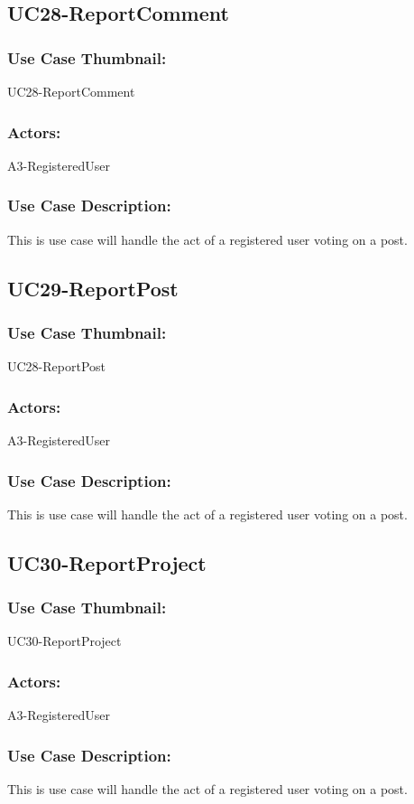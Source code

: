 \documentclass[11pt, openany]{report}
\begin{document}
\subsection{UC28-ReportComment}
\label{sUC28}
\subsubsection*{Use Case Thumbnail:}
UC28-ReportComment
\subsubsection*{Actors:}
A3-RegisteredUser
\subsubsection*{Use Case Description:}
This is use case will handle the act of a registered user voting on a post.

\subsection{UC29-ReportPost}
\label{sUC29}
\subsubsection*{Use Case Thumbnail:}
UC28-ReportPost
\subsubsection*{Actors:}
A3-RegisteredUser
\subsubsection*{Use Case Description:}
This is use case will handle the act of a registered user voting on a post.


\subsection{UC30-ReportProject}
\label{sUC30}
\subsubsection*{Use Case Thumbnail:}
UC30-ReportProject
\subsubsection*{Actors:}
A3-RegisteredUser
\subsubsection*{Use Case Description:}
This is use case will handle the act of a registered user voting on a post.
\end{document}
